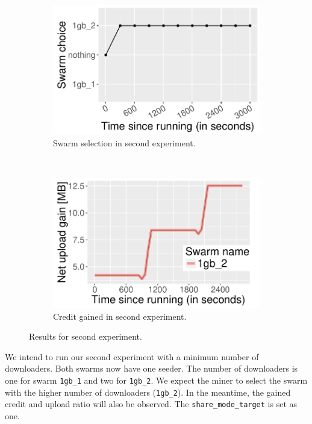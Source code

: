 \begin{figure}[h]
	\begin{subfigure}[t]{0.5\textwidth}
		\centering
		\includegraphics[width=\textwidth]{pics/results/valgain0.pdf}
		\caption{Swarm selection in second experiment.}
		\label{fig:val0gain}
	\end{subfigure}
	~
	\begin{subfigure}[t]{0.5\textwidth}
		\centering
		\includegraphics[width=\textwidth]{pics/results/valgain.pdf}
		\caption{Credit gained in second experiment.}
		\label{fig:vgain}
	\end{subfigure}
	\caption{Results for second experiment.}
\end{figure}

We intend to run our second experiment with a minimum number of downloaders. Both swarms now have one seeder. The number of downloaders is one for swarm \texttt{1gb\_1} and two  for \texttt{1gb\_2}. We expect the miner to select the swarm with the higher number of downloaders (\texttt{1gb\_2}). In the meantime, the  gained credit and upload ratio will also be observed. The \texttt{share\_mode\_target} is set as one.

